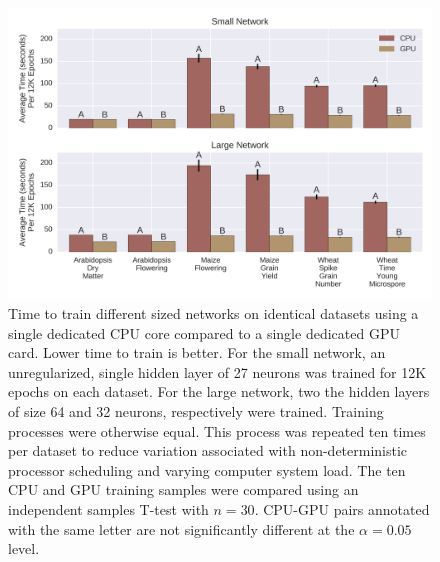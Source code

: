 
\begin{figure}[htbp]
\renewcommand{\familydefault}{\sfdefault}\normalfont
\centering 
\includegraphics[keepaspectratio,width=\linewidth,height=\textheight]{g3_article/figures/time_comparison.png}
    \caption{Time to train different sized networks on identical datasets using a single dedicated CPU core
             compared to a single dedicated GPU card. Lower time to train is better. For the small network, 
             an unregularized, single hidden layer of 27 neurons was trained for 12K epochs on each dataset. 
             For the large network, two the hidden layers of size 64 and 32 neurons, respectively were trained. 
             Training processes were otherwise equal. This process was repeated ten times per dataset to 
             reduce variation associated with non-deterministic processor scheduling and varying computer system load.
             The ten CPU and GPU training samples were compared using an independent samples T-test with $n=30$. 
             CPU-GPU pairs annotated with the same letter are not significantly different 
             at the $\alpha=0.05$ level.}
\label{fig:time-comparison}
\end{figure}

